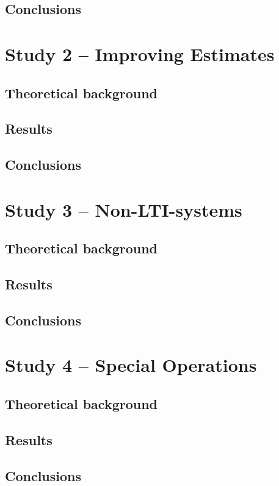 \documentclass[10pt]{article}
\begin{document}
\subsection{Conclusions}


\clearpage



\section{Study 2 – Improving Estimates}


\subsection{Theoretical background}


\subsection{Results}


\subsection{Conclusions}


\clearpage


\section{Study 3 – Non-LTI-systems}


\subsection{Theoretical background}


\subsection{Results}


\subsection{Conclusions}


\clearpage


\section{Study 4 – Special Operations}


\subsection{Theoretical background}


\subsection{Results}


\subsection{Conclusions}
\end{document}

